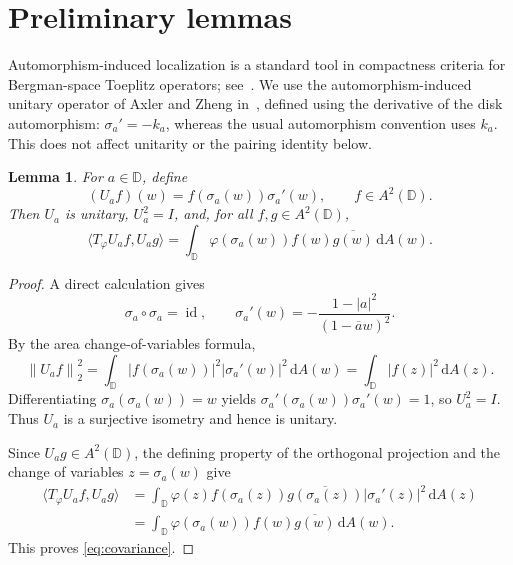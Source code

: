 \documentclass[12pt,a4paper]{article}
\newtheorem{lemma}[theorem]{Lemma}
\theoremstyle{remark}
\newcommand{\D}{\mathbb D}
\newcommand{\dA}{\,\mathrm dA}
\newcommand{\A}{A^2(\D)}
\newcommand{\norm}[1]{\left\lVert#1\right\rVert}
\DeclareMathOperator{\id}{id}
\begin{document}
\section{Preliminary lemmas}
Automorphism-induced localization is a standard tool in compactness criteria for Bergman-space Toeplitz operators; see~\cite{AZ1998,SZ1992,TV2018}.
We use the automorphism-induced unitary operator of Axler and Zheng in~\cite{AZ1998}, defined using the derivative of the disk automorphism:
$\sigma_a'=-k_a$, whereas the usual automorphism convention uses $k_a$.
This does not affect unitarity or the pairing identity below.
\begin{lemma}\label{lem:unitary}
For $a\in\D$, define
\[
(U_af)(w)=f(\sigma_a(w))\sigma_a'(w),\qquad f\in\A.
\]
Then $U_a$ is unitary, $U_a^2=I$, and, for all $f,g\in\A$,
\begin{equation}\label{eq:covariance}
\langle T_\varphi U_af,U_ag\rangle
=\int_\D\varphi(\sigma_a(w))f(w)\overline{g(w)}\dA(w).
\end{equation}
\end{lemma}
\begin{proof}
A direct calculation gives
\[
\sigma_a\circ\sigma_a=\id,
\qquad \sigma_a'(w)=-\frac{1-|a|^2}{(1-\overline a w)^2}.
\]
By the area change-of-variables formula,
\[
\norm{U_af}_2^2
=\int_\D|f(\sigma_a(w))|^2|\sigma_a'(w)|^2\dA(w)
=\int_\D|f(z)|^2\dA(z).
\]
Differentiating $\sigma_a(\sigma_a(w))=w$ yields
$\sigma_a'(\sigma_a(w))\sigma_a'(w)=1$, so $U_a^2=I$.
Thus $U_a$ is a surjective isometry and hence is unitary.

Since $U_ag\in\A$, the defining property of the orthogonal projection and the change of variables $z=\sigma_a(w)$ give
\begin{align*}
\langle T_\varphi U_af,U_ag\rangle
&=\int_\D\varphi(z)f(\sigma_a(z))
  \overline{g(\sigma_a(z))}|\sigma_a'(z)|^2\dA(z)\\
&=\int_\D\varphi(\sigma_a(w))f(w)\overline{g(w)}\dA(w).
\end{align*}
This proves \eqref{eq:covariance}.
\end{proof}
\end{document}
